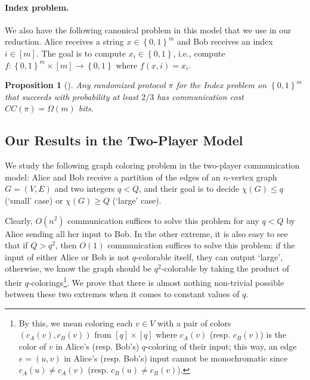 \documentclass[11pt]{article}
\newtheorem{proposition}[lemma]{Proposition}
\theoremstyle{definition}
\renewcommand{\leq}{\leqslant}
\renewcommand{\geq}{\geqslant}
\newcommand{\set}[1]{\ensuremath{\left\{ #1 \right\}}}
\begin{document}
\paragraph{Index problem.} We also have the following canonical problem in this model that we use in our reduction. 
Alice receives a string $x \in \set{0,1}^m$ and Bob receives an index $i \in [m]$. The goal is to compute $x_i \in \set{0,1}$, i.e., compute $f: \set{0,1}^{m} \times [m] \rightarrow \set{0,1}$ where $f(x,i) = x_i$. 
\begin{proposition}[\!\!\cite{KNR95}]\label{prop:INDEX-lowerbound}
    Any randomized protocol $\pi$ for the Index problem on $\set{0,1}^m$ that succeeds with probability at least $2/3$ has communication cost $CC(\pi) = \Omega(m)$ bits. 
\end{proposition}
    
\subsection{Our Results in the Two-Player Model}\label{sec:two-player-res}

We study the following graph coloring problem in the two-player communication model: Alice and Bob receive a partition of the edges of an $n$-vertex graph $G=(V,E)$ and two integers $q < Q$, and their goal is to decide $\chi(G) \leq q$ (`small' case) or $\chi(G) \geq Q$ (`large' case). 

Clearly, $O(n^2)$ communication suffices to solve this problem for any $q < Q$ by Alice sending all her input to Bob. In the other extreme, it is also easy to see that if $Q > q^2$, then $O(1)$ communication suffices to solve 
this problem: if the input of either Alice or Bob is not $q$-colorable itself, they can output `large', otherwise, we know the graph should be $q^2$-colorable by taking the product of their $q$-colorings\footnote{\label{footnote:product}By this, we mean
coloring each $v \in V$ with a pair of colors $(c_A(v),c_B(v))$ from $[q] \times [q]$ where $c_A(v)$ (resp. $c_B(v)$) is the color of $v$ in Alice's (resp. Bob's) $q$-coloring of their input; this way, an edge $e=(u,v)$ in Alice's (resp. Bob's) input 
cannot be monochromatic since $c_A(u) \neq c_A(v)$ (resp. $c_B(u) \neq c_B(v)$).}. We prove that there is almost nothing non-trivial possible between these two extremes when it comes to constant values of $q$. 
\end{document}
